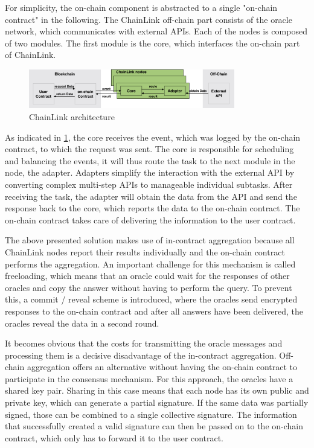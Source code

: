 \documentclass[conference]{IEEEtran}
\begin{document}
For simplicity, the on-chain component is abstracted to a single "on-chain contract" in the following.
The ChainLink off-chain part consists of the oracle network, which communicates with external APIs. Each of the nodes is composed of two modules. The first module is the core, which interfaces the on-chain part of ChainLink. 
\begin{figure}[h]
	\begin{center}
		\includegraphics[width=9cm]{ChainLink.png}
		\caption{ChainLink architecture}
		\label{chainlink}
	\end{center}
\end{figure}  
As indicated in \ref{chainlink}, the core receives the event, which was logged by the on-chain contract, to which the request was sent. The core is responsible for scheduling and balancing the events, it will thus route the task to the next module in the node, the adapter. Adapters simplify the interaction with the external API by converting complex multi-step APIs to manageable individual subtasks. After receiving the task, the adapter will obtain the data from the API and send the response back to the core, which reports the data to the on-chain contract. The on-chain contract takes care of delivering the information to the user contract. \cite{Ellis2017} \par 
The above presented solution makes use of in-contract aggregation because all ChainLink nodes report their results individually and the on-chain contract performs the aggregation. An important challenge for this mechanism is called freeloading, which means that an oracle could wait for the responses of other oracles and copy the answer without having to perform the query. To prevent this, a commit / reveal scheme is introduced, where the oracles send encrypted responses to the on-chain contract and after all answers have been delivered, the oracles reveal the data in a second round. \cite{Ellis2017} \par 
It becomes obvious that the costs for transmitting the oracle messages and processing them is a decisive disadvantage of the in-contract aggregation. Off-chain aggregation offers an alternative without having the on-chain contract to participate in the consensus mechanism. For this approach, the oracles have a shared key pair. Sharing in this case means that each node has its own public and private key, which can generate a partial signature. If the same data was partially signed, those can be combined to a single collective signature. The information that successfully created a valid signature can then be passed on to the on-chain contract, which only has to forward it to the user contract. \cite{Ellis2017} \par
\end{document}
